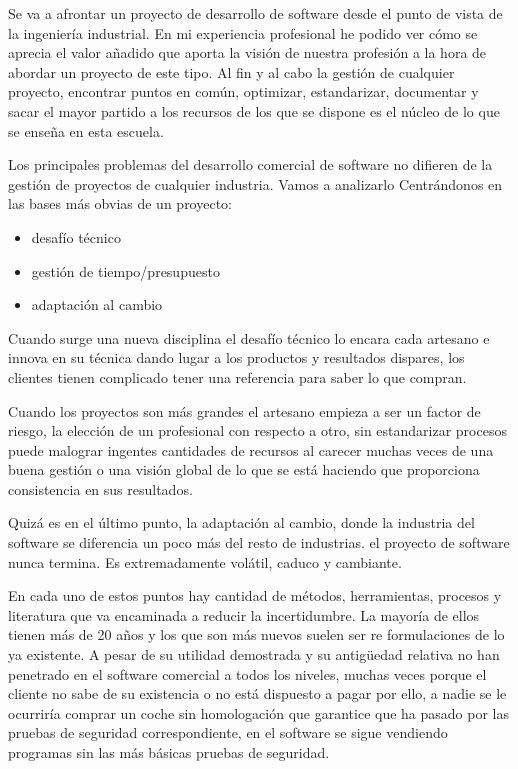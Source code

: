  
Se va a afrontar un proyecto de desarrollo de software desde el punto de vista de la ingeniería industrial. En mi experiencia profesional he podido ver cómo se aprecia el valor añadido que aporta la visión de nuestra profesión a la hora de abordar un proyecto de este tipo. Al fin y al cabo la gestión de cualquier proyecto, encontrar puntos en común, optimizar, estandarizar, documentar y sacar el mayor partido a los recursos de los que se dispone es el núcleo de lo que se enseña en esta escuela.
 
Los principales problemas del desarrollo comercial de software no difieren de la gestión de proyectos de cualquier industria. Vamos a analizarlo Centrándonos en las bases más obvias de un proyecto: 

\begin{itemize}
 	\item desafío técnico
	\item gestión de tiempo/presupuesto
	\item adaptación al cambio
\end{itemize} 

Cuando surge una nueva disciplina el desafío técnico lo encara cada artesano e innova en su técnica dando lugar a los productos y resultados dispares, los clientes tienen complicado tener una referencia para saber lo que compran.

Cuando los proyectos son más grandes el artesano empieza a ser un factor de riesgo, la elección de un profesional con respecto a otro, sin estandarizar procesos puede malograr ingentes cantidades de recursos al carecer muchas veces de una buena gestión o una visión global de lo que se está haciendo que proporciona consistencia en sus resultados.

Quizá es en el último punto, la adaptación al cambio, donde la industria del software se diferencia un poco más del resto de industrias. el proyecto de software nunca termina. Es extremadamente volátil, caduco y cambiante.

En cada uno de estos puntos hay cantidad de métodos, herramientas, procesos y literatura que va encaminada a reducir la incertidumbre. La mayoría de ellos tienen más de 20 años y los que son más nuevos suelen ser re formulaciones de lo ya existente. A pesar de su utilidad demostrada y su antigüedad relativa no han penetrado en el software comercial a todos los niveles, muchas veces porque el cliente no sabe de su existencia o no está dispuesto a pagar por ello, a nadie se le ocurriría comprar un coche sin homologación que garantice que ha pasado por las pruebas de seguridad correspondiente, en el software se sigue vendiendo programas sin las más básicas pruebas de seguridad.

